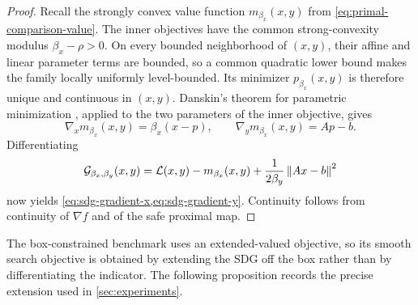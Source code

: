 \begin{proof}
  Recall the strongly convex value function
  \(m_{\beta_x}(x,y)\) from \cref{eq:primal-comparison-value}.  The inner
  objectives have the common strong-convexity modulus
  \(\beta_x-\rho>0\).  On every bounded neighborhood of \((x,y)\), their
  affine and linear parameter terms are bounded, so a common quadratic lower
  bound makes the family locally uniformly level-bounded.  Its minimizer
  \(p_{\beta_x}(x,y)\) is therefore unique and continuous in \((x,y)\).
  Danskin's theorem for parametric minimization
  \citep[Theorem~10.58]{RockafellarWets1998}, applied to the two parameters
  of the inner objective, gives
  \[
    \nabla_xm_{\beta_x}(x,y)=\beta_x(x-p),
    \qquad
    \nabla_ym_{\beta_x}(x,y)=Ap-b.
  \]
  Differentiating
  \[
    \mathcal{G}_{\beta_x,\beta_y}(x,y)
    =
    \mathcal{L}(x,y)-m_{\beta_x}(x,y)
    +\frac{1}{2\beta_y}\left\lVert Ax-b\right\rVert^{2}
  \]
  now yields \cref{eq:sdg-gradient-x,eq:sdg-gradient-y}.  Continuity follows
  from continuity of \(\nabla f\) and of the safe proximal map.
\end{proof}

The box-constrained benchmark uses an extended-valued objective, so its
smooth search objective is obtained by extending the SDG off the box rather
than by differentiating the indicator.  The following proposition records
the precise extension used in \cref{sec:experiments}.

